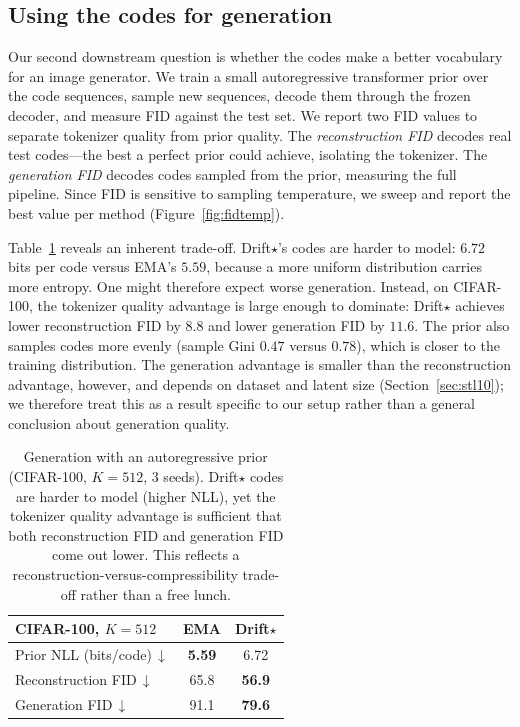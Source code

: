 \documentclass[10pt,twocolumn,letterpaper]{article}
\begin{document}
\subsection{Using the codes for generation}
\label{sec:generation}

Our second downstream question is whether the codes make a better vocabulary for an
image generator. We train a small autoregressive transformer prior over the code
sequences, sample new sequences, decode them through the frozen decoder, and measure
FID against the test set. We report two FID values to separate tokenizer quality
from prior quality. The \emph{reconstruction FID} decodes real test codes---the best
a perfect prior could achieve, isolating the tokenizer. The \emph{generation FID}
decodes codes sampled from the prior, measuring the full pipeline. Since FID is
sensitive to sampling temperature, we sweep and report the best value per method
(Figure~\ref{fig:fidtemp}).

Table~\ref{tab:generation} reveals an inherent trade-off. Drift$\star$'s codes are
harder to model: $6.72$ bits per code versus EMA's $5.59$, because a more uniform
distribution carries more entropy. One might therefore expect worse generation.
Instead, on CIFAR-100, the tokenizer quality advantage is large enough to dominate:
Drift$\star$ achieves lower reconstruction FID by $8.8$ and lower generation FID by
$11.6$. The prior also samples codes more evenly (sample Gini $0.47$ versus $0.78$),
which is closer to the training distribution. The generation advantage is smaller
than the reconstruction advantage, however, and depends on dataset and latent size
(Section~\ref{sec:stl10}); we therefore treat this as a result specific to our setup
rather than a general conclusion about generation quality.

\begin{table}[ht]
\centering\small
\begin{tabular}{lcc}
\toprule
CIFAR-100, $K{=}512$ & EMA & Drift$\star$\\
\midrule
Prior NLL (bits/code)\,$\downarrow$ & \textbf{5.59} & 6.72\\
Reconstruction FID\,$\downarrow$ & 65.8 & \textbf{56.9}\\
Generation FID\,$\downarrow$ & 91.1 & \textbf{79.6}\\
\bottomrule
\end{tabular}
\vspace{2mm}
\caption{Generation with an autoregressive prior (CIFAR-100, $K{=}512$, $3$ seeds).
Drift$\star$ codes are harder to model (higher NLL), yet the tokenizer quality
advantage is sufficient that both reconstruction FID and generation FID come out
lower. This reflects a reconstruction-versus-compressibility trade-off rather than
a free lunch.}
\label{tab:generation}
\end{table}
\end{document}

